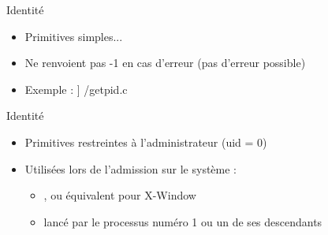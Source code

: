 
\begin {frame} {Identité}

    \begin {itemize}
	\item Primitives simples...
	\item Ne renvoient pas -1 en cas d'erreur (pas d'erreur possible)
	\item Exemple :
	    \fD\lstmonstyle] {\inc/getpid.c}
    \end {itemize}
\end {frame}

\begin {frame} {Identité}

    \begin {itemize}
	\item Primitives restreintes à l'administrateur (uid = 0)

	\item Utilisées lors de l'admission sur le système :
	    \begin {itemize}
		\item {},  ou équivalent pour
		    X-Window
		\item lancé par le processus numéro 1 ou un de ses
		    descendants
	    \end {itemize}
    \end {itemize}
\end {frame}


